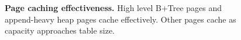 \begin{figure}
  \centering
  \caption{\textbf{Page caching effectiveness.} High level B+Tree pages and append-heavy heap pages cache effectively.  Other pages cache as capacity approaches table size.}
  \label{fig::Caching}
\end{figure}

